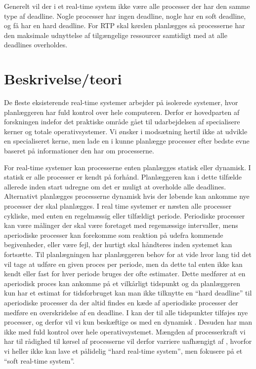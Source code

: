 Generelt vil der i et real-time system ikke være alle processer der har den samme type af deadline. Nogle processer har ingen deadline, nogle har en soft deadline, og få har en hard deadline. For RTP skal  kørslen  planlægges så processerne har den maksimale udnyttelse af tilgængelige ressourcer samtidigt med at alle deadlines overholdes.

\section{Beskrivelse/teori}
De fleste eksisterende real-time systemer arbejder på isolerede systemer, hvor planlæggeren har fuld kontrol over hele computeren. Derfor er hovedparten af forskningen indefor det praktiske område gået til udarbejdelsen af specialisere kerner og totale operativsystemer\cite{damm1989real, jones1979staros, levi1989maruti,ramamritham14scheduling}. Vi ønsker i modsætning hertil ikke at udvikle en specialiseret kerne, men lade \sched en i \pycsp kunne planlægge processer efter bedste evne baseret på informationer den har om processerne.

For real-time systemer kan processerne enten planlægges statisk eller dynamisk\cite{cheng1987scheduling}. I statisk er alle processer er kendt på forhånd. Planlæggeren kan i dette tilfælde allerede inden start udregne om det er muligt at overholde alle deadlines. Alternativt planlægges processerne dynamisk hvis der  løbende kan ankomme nye  processer der skal planlægges. I real time systemer er næsten alle processer cykliske, med enten en regelmæssig eller tilfældigt periode. Periodiske processer kan være målinger der skal være foretaget med regemæssige intervaller, mens aperiodiske processer kan forekomme som reaktion på udefra kommende begivenheder, eller være fejl, der hurtigt skal håndteres inden systemet kan fortsætte.
Til planlægningen har planlæggeren behov for at vide hvor lang tid det vil tage at udføre en given proces per periode, men da dette tal enten ikke kan kendt eller fast for hver periode bruges der ofte estimater. Dette medfører at en aperiodisk proces kan ankomme på et vilkårligt tidspunkt og da planlæggeren kun har et estimat for tidsforbruget kan man  ikke tilknytte en ``hard deadline'' til aperiodiske processer da der altid findes en kæde af aperiodiske processer der medføre en overskridelse af en deadline. I \pycsp kan der til alle tidspunkter tilføjes nye processer, og derfor vil vi kun beskæftige os med en dynamisk \sched. Desuden har man ikke med \pycsp fuld kontrol over hele operativsystemet. Mængden af processerkraft vi har til rådighed til kørsel af processerne vil derfor varriere uafhængigt af \pycsp, hvorfor vi heller ikke kan lave et pålidelig ``hard real-time system'', men fokusere på et ``soft real-time system''.

